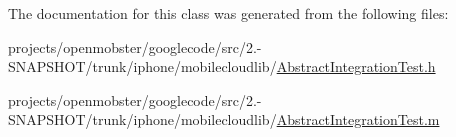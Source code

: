 \-The documentation for this class was generated from the following files\-:\begin{DoxyCompactItemize}
\item 
projects/openmobster/googlecode/src/2.-\/\-S\-N\-A\-P\-S\-H\-O\-T/trunk/iphone/mobilecloudlib/\hyperlink{_abstract_integration_test_8h}{\-Abstract\-Integration\-Test.\-h}\item 
projects/openmobster/googlecode/src/2.-\/\-S\-N\-A\-P\-S\-H\-O\-T/trunk/iphone/mobilecloudlib/\hyperlink{_abstract_integration_test_8m}{\-Abstract\-Integration\-Test.\-m}\end{DoxyCompactItemize}
